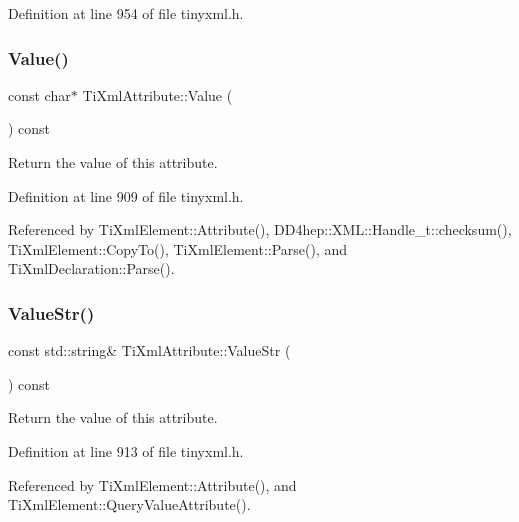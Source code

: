 Definition at line 954 of file tinyxml.\+h.

\hypertarget{class_ti_xml_attribute_ac9f0b56fcacbedb6eb49e5f282bef014}{}\label{class_ti_xml_attribute_ac9f0b56fcacbedb6eb49e5f282bef014} 
\subsubsection{\texorpdfstring{Value()}{Value()}}
{\footnotesize\ttfamily const char$\ast$ Ti\+Xml\+Attribute\+::\+Value (\begin{DoxyParamCaption}{ }\end{DoxyParamCaption}) const\hspace{0.3cm}{\ttfamily [inline]}}



Return the value of this attribute. 



Definition at line 909 of file tinyxml.\+h.



Referenced by Ti\+Xml\+Element\+::\+Attribute(), D\+D4hep\+::\+X\+M\+L\+::\+Handle\+\_\+t\+::checksum(), Ti\+Xml\+Element\+::\+Copy\+To(), Ti\+Xml\+Element\+::\+Parse(), and Ti\+Xml\+Declaration\+::\+Parse().

\hypertarget{class_ti_xml_attribute_af70a11c3a0c07e61bd6e215f1f9b24e9}{}\label{class_ti_xml_attribute_af70a11c3a0c07e61bd6e215f1f9b24e9} 
\subsubsection{\texorpdfstring{Value\+Str()}{ValueStr()}}
{\footnotesize\ttfamily const std\+::string\& Ti\+Xml\+Attribute\+::\+Value\+Str (\begin{DoxyParamCaption}{ }\end{DoxyParamCaption}) const\hspace{0.3cm}{\ttfamily [inline]}}



Return the value of this attribute. 



Definition at line 913 of file tinyxml.\+h.



Referenced by Ti\+Xml\+Element\+::\+Attribute(), and Ti\+Xml\+Element\+::\+Query\+Value\+Attribute().



